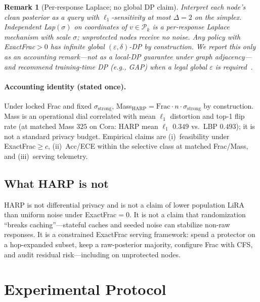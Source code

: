\documentclass[conference]{IEEEtran}
\newtheorem{remark}{Remark}
\begin{document}
\begin{remark}[Per-response Laplace; no global DP claim]
\label{thm:local-eps}
Interpret each node's clean posterior as a query with $\ell_1$-sensitivity at most $\Delta{=}2$ on the simplex.
Independent Lap$(\sigma)$ on coordinates of $v\in\mathcal{P}_k$ is a per-response Laplace mechanism with scale $\sigma$; unprotected nodes receive no noise.
Any policy with ExactFrac$>0$ has infinite \emph{global} $(\varepsilon,\delta)$-DP by construction.
We report this only as an accounting remark---not as a local-DP guarantee under graph adjacency---and recommend training-time DP (e.g., GAP) when a legal global $\varepsilon$ is required~\cite{sajadmanesh2023gap}.
\end{remark}
\paragraph{Accounting identity (stated once).}
\label{para:mass-identity}
Under locked Frac and fixed $\sigma_{\mathrm{strong}}$, Mass$_{\mathrm{HARP}}=\mathrm{Frac}\cdot n\cdot\sigma_{\mathrm{strong}}$ by construction.
Mass is an operational dial correlated with mean $\ell_1$ distortion and top-1 flip rate (at matched Mass $325$ on Cora: HARP mean $\ell_1$ $0.349$ vs.\ LBP $0.493$); it is not a standard privacy budget.
Empirical claims are (i)~feasibility under ExactFrac$\ge c$, (ii)~Acc/ECE within the selective class at matched Frac/Mass, and (iii)~serving telemetry.

\subsection{What HARP is not}
HARP is not differential privacy and is not a claim of lower population LiRA than uniform noise under ExactFrac$=0$.
It is not a claim that randomization ``breaks caching''---stateful caches and seeded noise can stabilize non-raw responses.
It is a constrained ExactFrac serving framework: spend a protector on a hop-expanded subset, keep a raw-posterior majority, configure Frac with CFS, and audit residual risk---including on unprotected nodes.


\section{Experimental Protocol}
\label{sec:protocol}
\end{document}
